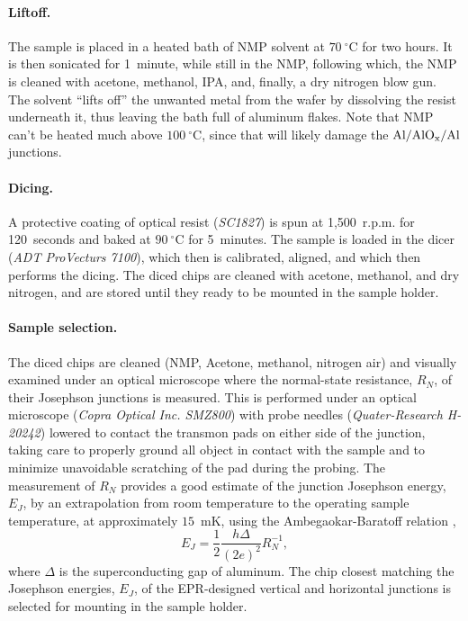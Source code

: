 \paragraph{Liftoff.}

The sample is placed in a heated bath of NMP solvent at $70~\ensuremath{^{\circ}}\text{C}$
for two hours. It is then sonicated for 1~minute, while still in
the NMP, following which, the NMP is cleaned with acetone, methanol,
IPA, and, finally, a dry nitrogen blow gun. The solvent ``lifts off''
the unwanted metal from the wafer by dissolving the resist underneath
it, thus leaving the bath full of aluminum flakes. Note that NMP
can't be heated much above $100~\ensuremath{^{\circ}}\text{C}$, since
that will likely damage the $\text{Al/Al\ensuremath{\mathrm{O}_{\mathrm{x}}}/Al}$
junctions.  

\paragraph{Dicing.}

A protective coating of optical resist (\emph{SC1827}) is spun at
1,500~r.p.m. for 120~seconds and baked at $90~\ensuremath{^{\circ}}\text{C}$
for 5~minutes. The sample is loaded in the dicer (\emph{ADT ProVecturs
7100}), which then is calibrated, aligned, and which then performs
the dicing. The diced chips are cleaned with acetone, methanol, and
dry nitrogen, and are stored until they ready to be mounted in the
sample holder. 

\paragraph*{Sample selection.}

The diced chips are cleaned (NMP, Acetone, methanol, nitrogen air)
and visually examined under an optical microscope where the normal-state
resistance, $R_{N}$, of their Josephson junctions is measured. This
is performed under an optical microscope (\emph{Copra Optical Inc.
SMZ800}) with probe needles (\emph{Quater-Research H-20242}) lowered
to contact the transmon pads on either side of the junction, taking
care to properly ground all object in contact with the sample and
to minimize unavoidable scratching of the pad during the probing.
The measurement of $R_{N}$ provides a good estimate of the junction
Josephson energy, $E_{J}$, by an extrapolation from room temperature
to the operating sample temperature, at approximately $15$~mK, using
the Ambegaokar-Baratoff relation \citep{Ambegaokar1963},
\begin{equation}
E_{J}=\frac{1}{2}\frac{h\Delta}{\left(2e\right)^{2}}R_{N}^{-1},
\end{equation}
where $\Delta$ is the superconducting gap of aluminum. The chip
closest matching the Josephson energies, $E_{J}$, of the EPR-designed
vertical and horizontal junctions is selected for mounting in the
sample holder. 

